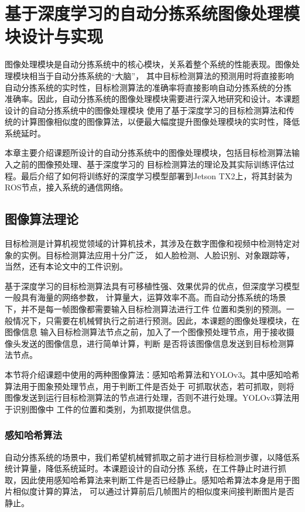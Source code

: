\chapter{基于深度学习的自动分拣系统图像处理模块设计与实现}
图像处理模块是自动分拣系统中的核心模块，关系着整个系统的性能表现。图像处理模块相当于自动分拣系统的“大脑”，
其中目标检测算法的预测用时将直接影响自动分拣系统的实时性，目标检测算法的准确率将直接影响自动分拣系统的分拣
准确率。因此，自动分拣系统的图像处理模块需要进行深入地研究和设计。本课题设计的自动分拣系统中的图像处理模块
使用了基于深度学习的目标检测算法和传统的计算图像相似度的图像算法，以便最大幅度提升图像处理模块的实时性，降低
系统延时。

本章主要介绍课题所设计的自动分拣系统中的图像处理模块，包括目标检测算法输入之前的图像预处理、基于深度学习的
目标检测算法的理论及其实际训练评估过程。最后介绍了如何将训练好的深度学习模型部署到Jetson TX2上，将其封装为
ROS节点，接入系统的通信网络。

\section{图像算法理论}
目标检测是计算机视觉领域的计算机技术，其涉及在数字图像和视频中检测特定对象的实例。目标检测算法应用十分广泛，
如人脸检测、人脸识别、对象跟踪等，当然，还有本论文中的工件识别。

基于深度学习的目标检测算法具有可移植性强、效果优异的优点，但深度学习模型一般具有海量的网络参数，
计算量大，运算效率不高。而自动分拣系统的场景下，并不是每一帧图像都需要输入目标检测算法进行工件
位置和类别的预测。一般情况下，只需要在机械臂执行之前进行预测。因此，本课题的图像处理模块，在图像信息
输入目标检测算法节点之前，加入了一个图像预处理节点，用于接收摄像头发送的图像信息，进行简单计算，判断
是否将该图像信息发送到目标检测算法节点。

本节将介绍课题中使用的两种图像算法：感知哈希算法\cite{ganzhihash}和YOLOv3。其中感知哈希算法用于图象预处理节点，用于判断工件是否处于
可抓取状态，若可抓取，则将图像发送到运行目标检测算法的节点进行处理，否则不进行处理。YOLOv3算法用于识别图像中
工件的位置和类别，为抓取提供信息。

\subsection{感知哈希算法}

自动分拣系统的场景中，我们希望机械臂抓取之前才进行目标检测步骤，以降低系统计算量，降低系统延时。本课题设计的自动分拣
系统，在工件静止时进行抓取，因此使用感知哈希算法来判断工件是否已经静止。感知哈希算法本身是用于图片相似度计算的算法，
可以通过计算前后几帧图片的相似度来间接判断图片是否静止。

